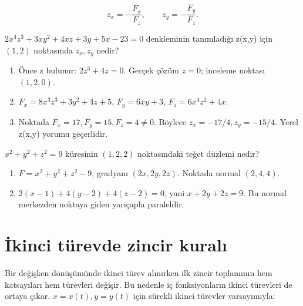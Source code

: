{\small\[
z_x=-\frac{F_x}{F_z},\qquad z_y=-\frac{F_y}{F_z}.
\]}
\begin{tcolorbox}[title={Örnek 6.6 | Tahtadaki kapalı türev sorusu},colframe=accent]\(2x^4z^3+3xy^2+4xz+3y+5x-23=0\) denkleminin tanımladığı z(x,y) için \((1,2)\) noktasında \(z_x,z_y\) nedir?
\par{}\end{tcolorbox}
\begin{tcolorbox}[title={Adım adım çözüm},colback=green!3!white,colframe=green]\begin{enumerate}
\item Önce z bulunur: \(2z^3+4z=0\). Gerçek çözüm \(z=0\); inceleme noktası \((1,2,0)\).
\item \(F_x=8x^3z^3+3y^2+4z+5\), \(F_y=6xy+3\), \(F_z=6x^4z^2+4x\).
\item Noktada \(F_x=17,F_y=15,F_z=4\ne0\). Böylece \(z_x=-17/4,z_y=-15/4\). Yerel z(x,y) yorumu geçerlidir.
\end{enumerate}\end{tcolorbox}
\begin{tcolorbox}[title={Örnek 6.7 | Kapalı denklemin teğet düzlemi},colframe=accent]\(x^2+y^2+z^2=9\) küresinin \((1,2,2)\) noktasındaki teğet düzlemi nedir?
\par\vspace{1mm}{\scriptsize\sffamily Pekiştirme}\end{tcolorbox}
\begin{tcolorbox}[title={Adım adım çözüm},colback=green!3!white,colframe=green]\begin{enumerate}
\item \(F=x^2+y^2+z^2-9\), gradyanı \((2x,2y,2z)\). Noktada normal \((2,4,4)\).
\item \(2(x-1)+4(y-2)+4(z-2)=0\), yani \(x+2y+2z=9\). Bu normal merkezden noktaya giden yarıçapla paraleldir.
\end{enumerate}\end{tcolorbox}
\section{İkinci türevde zincir kuralı}
Bir değişken dönüşümünde ikinci türev alınırken ilk zincir toplamının hem katsayıları hem türevleri değişir. Bu nedenle iç fonksiyonların ikinci türevleri de ortaya çıkar. \(x=x(t),y=y(t)\) için sürekli ikinci türevler varsayımıyla:


